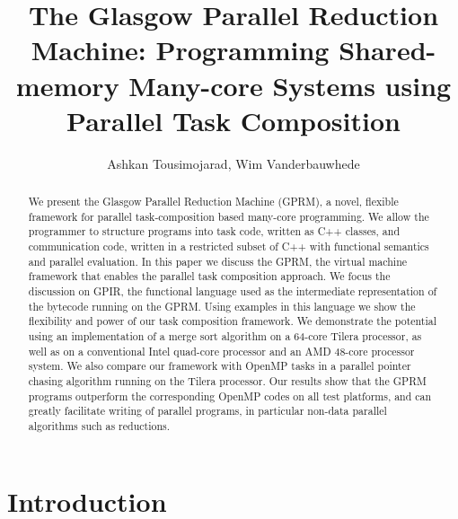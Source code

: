 \documentclass[copyright,creativecommons]{eptcs}
\begin{document}
\title{The Glasgow Parallel Reduction Machine: Programming Shared-memory Many-core Systems using Parallel Task Composition}

\author{Ashkan Tousimojarad, Wim Vanderbauwhede}





\def\titlerunning{GPRM: Programming Shared-memory Many-core Systems}

\def\authorrunning{A. Tousimojarad, W. Vanderbauwhede}

\maketitle

\begin{abstract}
We present the Glasgow Parallel Reduction Machine (GPRM), a novel,
flexible framework for parallel task-composition based many-core programming.
We allow the programmer to structure programs into task code, written
as C++ classes, and communication code, written in a restricted subset
of C++ with functional semantics and parallel evaluation. In this
paper we discuss the GPRM, the virtual machine framework that enables
the parallel task composition approach. We focus the discussion on
GPIR, the functional language used as the intermediate representation
of the bytecode running on the GPRM. Using examples in this language
we show the flexibility and power of our task composition framework.
We demonstrate the potential using an implementation of a merge sort
algorithm on a 64-core Tilera processor, as well as on a conventional
Intel quad-core processor and an AMD 48-core processor system. We
also compare our framework with OpenMP tasks in a parallel pointer
chasing algorithm running on the Tilera processor. Our results show
that the GPRM programs outperform the corresponding OpenMP codes on
all test platforms, and can greatly facilitate writing of parallel
programs, in particular non-data parallel algorithms such as reductions.
\end{abstract}

\section{Introduction}
\end{document}
